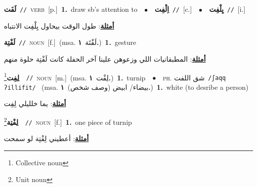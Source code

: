 \documentclass[10pt,a4paper,twoside]{article} %
\begin{document}
\begin{multicols}{2}
{\setlength\topsep{0pt}\textbf{\foreignlanguage{arabic}{لَفَت}}\ {\color{gray}\texttt{//}\color{black}}\ \textsc{verb}\ [p.]\ \textbf{1.}~draw sb's attention to\ \ $\bullet$\ \ \setlength\topsep{0pt}\textbf{\foreignlanguage{arabic}{اِلْفِت}}\ {\color{gray}\texttt{//}\color{black}}\ [c.]\ \ $\bullet$\ \ \setlength\topsep{0pt}\textbf{\foreignlanguage{arabic}{يِلْفِت}}\ {\color{gray}\texttt{//}\color{black}}\ [i.]\  \begin{flushright}\color{gray}\foreignlanguage{arabic}{\textbf{\underline{\foreignlanguage{arabic}{أمثلة}}}: طول الوقت بيحاول يِلْفِت الانتباه}\end{flushright}\color{black}} \vspace{2mm}

{\setlength\topsep{0pt}\textbf{\foreignlanguage{arabic}{لَفْتِة}}\ {\color{gray}\texttt{//}\color{black}}\ \textsc{noun}\ [f.]\ \color{gray}(msa. \foreignlanguage{arabic}{لَفْتَة}~\foreignlanguage{arabic}{\textbf{١.}})\color{black}\ \textbf{1.}~gesture\  \begin{flushright}\color{gray}\foreignlanguage{arabic}{\textbf{\underline{\foreignlanguage{arabic}{أمثلة}}}: المطبقانيات اللي وزعوهن علينا آخر الحفلة كانت لَفْتِة حلوة منهم}\end{flushright}\color{black}} \vspace{2mm}

{\setlength\topsep{0pt}\textbf{\foreignlanguage{arabic}{لِفِت}}\footnote{Collective noun}\ \ {\color{gray}\texttt{//}\color{black}}\ \textsc{noun}\ [m.]\ \color{gray}(msa. \foreignlanguage{arabic}{لِفْت}~\foreignlanguage{arabic}{\textbf{١.}})\color{black}\ \textbf{1.}~turnip\ \ $\bullet$\ \ \textsc{ph.} \color{gray} \foreignlanguage{arabic}{شق اللفت}\color{black}\ {\color{gray}\texttt{/{\sffamily ʃaqq ʔillifit}/}\color{black}}\ \color{gray} (msa. \foreignlanguage{arabic}{بيضاء/ ابيض (وصف شخص)}~\foreignlanguage{arabic}{\textbf{١.}})\color{black}\ \textbf{1.}~white (to desribe a person)\  \begin{flushright}\color{gray}\foreignlanguage{arabic}{\textbf{\underline{\foreignlanguage{arabic}{أمثلة}}}: يما خلليلي لِفِت}\end{flushright}\color{black}} \vspace{2mm}

{\setlength\topsep{0pt}\textbf{\foreignlanguage{arabic}{لِفْتِة}}\footnote{Unit noun}\ \ {\color{gray}\texttt{//}\color{black}}\ \textsc{noun}\ [f.]\ \textbf{1.}~one piece of turnip\  \begin{flushright}\color{gray}\foreignlanguage{arabic}{\textbf{\underline{\foreignlanguage{arabic}{أمثلة}}}: أعطيني لِفْتِة لو سمحت}\end{flushright}\color{black}} \vspace{2mm}


\end{multicols}
\end{document}
